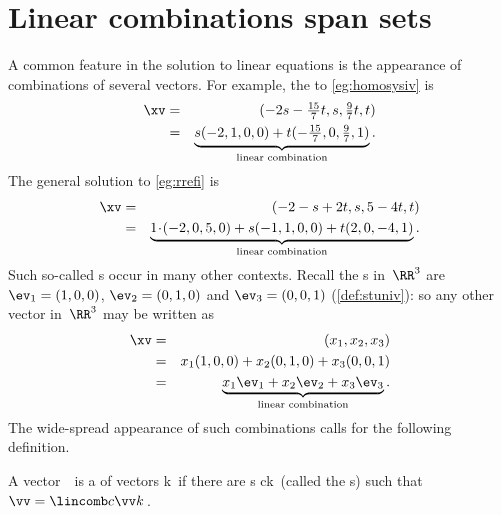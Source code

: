 
\section{Linear combinations span sets}
\label{sec:lcss}
{}

\begin{comment}
\pooliv{\S2.3} \layiv{\S1.3} \holti{\S2.1--2} \nakos{\S2.3}
\end{comment}



A common feature in the solution to linear equations is the  appearance of combinations of several vectors.
For example, the  to \autoref{eg:homosysiv}  is 
\begin{eqnarray*}
\xv&=&(-2s-\tfrac{15}7t,s,\tfrac97t,t) 
\\&=&\underbrace{s(-2,1,0,0)+t(-\tfrac{15}7,0,\tfrac97,1)}_{\text{linear combination}}.
\end{eqnarray*}
The general solution to \autoref{eg:rrefi} is
\begin{eqnarray*}
\xv&=&(-2-s+2t,s,5-4t,t)
\\&=&\underbrace{1\cdot(-2,0,5,0)+s(-1,1,0,0)+t(2,0,-4,1)}_{\text{linear combination}}.
\end{eqnarray*}
Such so-called s occur in many other contexts.
Recall the s in~\(\RR^3\) are \(\ev_1=(1,0,0)\), \(\ev_2=(0,1,0)\) and \(\ev_3=(0,0,1)\) (\autoref{def:stuniv}): so any other vector in~\(\RR^3\) may be written as
\begin{eqnarray*}
\xv&=&(x_1,x_2,x_3)
\\&=&x_1(1,0,0)+x_2(0,1,0)+x_3(0,0,1)
\\&=&\underbrace{x_1\ev_1+x_2\ev_2+x_3\ev_3}_{\text{linear combination}}.
\end{eqnarray*}
The wide-spread appearance of such combinations calls for the following definition.

\begin{definition} \label{def:lincom}
A vector~\vv\ is a  of vectors \hlist\vv k\ if there are s \hlist ck\ (called the s) such that \(\vv=\lincomb c\vv k\)\,.
\end{definition}


